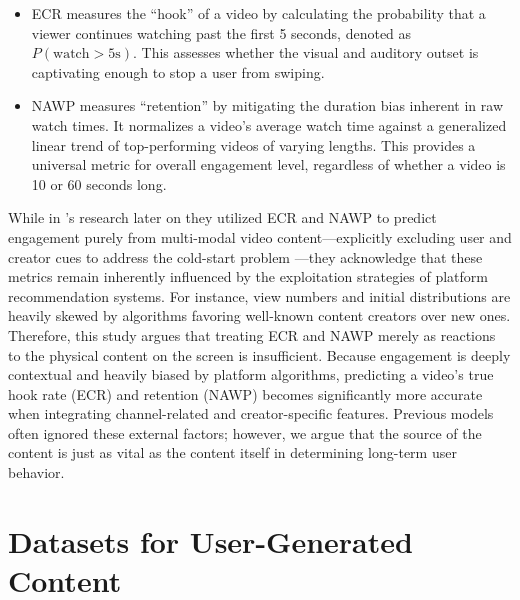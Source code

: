     \begin{itemize}
        \item ECR measures the ``hook'' of a video by calculating the probability that a viewer continues watching past the first 5 seconds, denoted as $P(\text{watch} > 5\text{s})$. This assesses whether the visual and auditory outset is captivating enough to stop a user from swiping.
    \end{itemize}
    
    \begin{itemize}
        \item NAWP measures ``retention'' by mitigating the duration bias inherent in raw watch times. It normalizes a video's average watch time against a generalized linear trend of top-performing videos of varying lengths. This provides a universal metric for overall engagement level, regardless of whether a video is 10 or 60 seconds long.
    \end{itemize}
    

While in \citeauthor{li2025vquala}'s \citeyear{li2025vquala} research later on they  utilized ECR and NAWP to predict engagement purely from multi-modal video content—explicitly excluding user and creator cues to address the cold-start problem —they acknowledge that these metrics remain inherently influenced by the exploitation strategies of platform recommendation systems. For instance, view numbers and initial distributions are heavily skewed by algorithms favoring well-known content creators over new ones. Therefore, this study argues that treating ECR and NAWP merely as reactions to the physical content on the screen is insufficient. Because engagement is deeply contextual and heavily biased by platform algorithms, predicting a video's true hook rate (ECR) and retention (NAWP) becomes significantly more accurate when integrating channel-related and creator-specific features. Previous models often ignored these external factors; however, we argue that the source of the content is just as vital as the content itself in determining long-term user behavior.



\section{Datasets for User-Generated Content}


